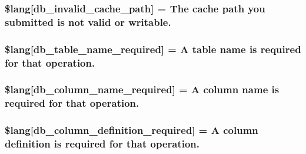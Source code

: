 \subsubsection[{\$lang}]{\setlength{\rightskip}{0pt plus 5cm}\$lang\mbox{[}\textquotesingle{}db\+\_\+invalid\+\_\+cache\+\_\+path\textquotesingle{}\mbox{]} = \textquotesingle{}The cache path you submitted is not valid or writable.\textquotesingle{}}\label{system_2language_2english_2db__lang_8php_a67157df2896b342e247ab744adf2b9e5}
\hypertarget{system_2language_2english_2db__lang_8php_a2899cf8f7246d7fa97660ea52856ade5}{}
\subsubsection[{\$lang}]{\setlength{\rightskip}{0pt plus 5cm}\$lang\mbox{[}\textquotesingle{}db\+\_\+table\+\_\+name\+\_\+required\textquotesingle{}\mbox{]} = \textquotesingle{}A table name is required {\bf for} that operation.\textquotesingle{}}\label{system_2language_2english_2db__lang_8php_a2899cf8f7246d7fa97660ea52856ade5}
\hypertarget{system_2language_2english_2db__lang_8php_ac87ab86a1f105d87327480b6d0659b13}{}
\subsubsection[{\$lang}]{\setlength{\rightskip}{0pt plus 5cm}\$lang\mbox{[}\textquotesingle{}db\+\_\+column\+\_\+name\+\_\+required\textquotesingle{}\mbox{]} = \textquotesingle{}A column name is required {\bf for} that operation.\textquotesingle{}}\label{system_2language_2english_2db__lang_8php_ac87ab86a1f105d87327480b6d0659b13}
\hypertarget{system_2language_2english_2db__lang_8php_ad0ba270704ec81f8f89e486a18660354}{}
\subsubsection[{\$lang}]{\setlength{\rightskip}{0pt plus 5cm}\$lang\mbox{[}\textquotesingle{}db\+\_\+column\+\_\+definition\+\_\+required\textquotesingle{}\mbox{]} = \textquotesingle{}A column definition is required {\bf for} that operation.\textquotesingle{}}\label{system_2language_2english_2db__lang_8php_ad0ba270704ec81f8f89e486a18660354}
\hypertarget{system_2language_2english_2db__lang_8php_ab22396948e25460833329cb8786ad831}{}
